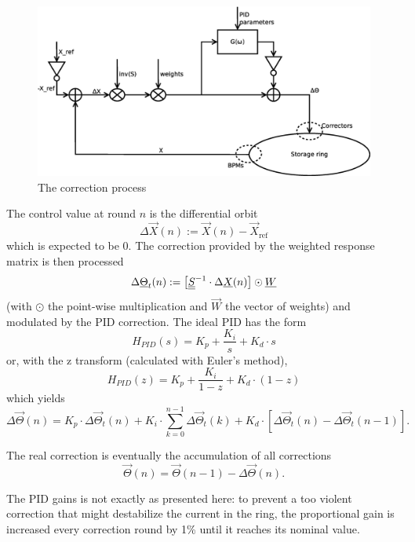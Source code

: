 \begin{figure}[!h]
    \centering
    \includegraphics[width=.85\linewidth]{img/correction}
    \caption{\label{fig:block_correction}The correction process}
\end{figure}

The control value at round $n$ is the differential orbit 
\begin{equation}
 \Delta \vec{X}(n) := \vec{X}(n)-\vec{X}_\text{ref}
\end{equation}
which is expected to be 0. The correction provided by the weighted response matrix is then processed
\begin{equation}
\Delta \underline{\Theta}_t(n) :=  \left[ \underline{\underline{S}}^{-1} \cdot \Delta \underline{X}(n) \right] \odot \underline{W}
\end{equation}
(with $\odot$ the point-wise multiplication and $\vec{W}$ the vector of weights) and modulated by the PID correction. The ideal PID has the form
\begin{equation}
H_{PID}(s) = K_p + \frac{K_i}{s} + K_d \cdot s 
\end{equation}
or, with the z transform (calculated with Euler's method),
\begin{equation}
H_{PID}(z) = K_p + \frac{K_i}{1-z} + K_d \cdot (1-z)
\end{equation}
which yields
\begin{equation}
\Delta \vec{\Theta}(n) =  K_p \cdot \Delta \vec{\Theta}_t(n) + K_i \cdot \sum\limits_{k=0}^{n-1}\Delta \vec{\Theta}_t(k) + K_d \cdot \left[\Delta \vec{\Theta}_t(n) - \Delta \vec{\Theta}_t(n-1)\right].
\end{equation}

The real correction is eventually the accumulation of all corrections
\begin{equation}
\vec{\Theta}(n) = \vec{\Theta}(n-1) - \Delta \vec{\Theta}(n).
\end{equation}

\remark The PID gains is not exactly as presented here: to prevent a too violent correction that might destabilize the current in the ring, the proportional gain is increased every correction round by 1\% until it reaches its nominal value.

